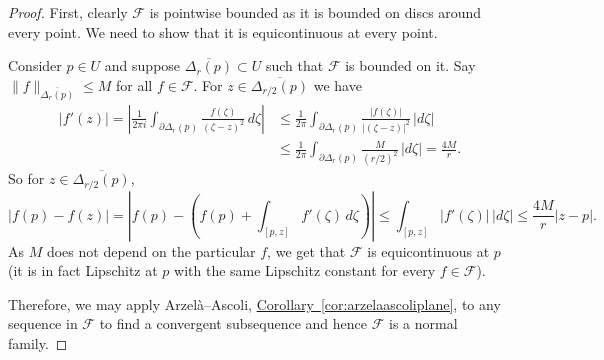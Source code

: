 \documentclass[12pt,openany]{book}
\newcommand{\sabs}[1]{\lvert {#1} \rvert}
\newcommand{\snorm}[1]{\lVert {#1} \rVert}
\newcommand{\abs}[1]{\left\lvert {#1} \right\rvert}
\newcommand{\sF}{{\mathscr{F}}}
\theoremstyle{plain}
\theoremstyle{remark}
\theoremstyle{definition}
\theoremstyle{exercise}
\theoremstyle{example}
\newcommand{\corref}[1]{\hyperref[#1]{Corollary~\ref*{#1}}}
\begin{document}
\begin{proof}
First, clearly $\sF$ is pointwise bounded as it is bounded on discs around
every point.
We need to show that it is equicontinuous at every point.

Consider $p \in U$ and suppose $\overline{\Delta_r(p)} \subset U$
such that $\sF$ is bounded on it.
Say $\snorm{f}_{\overline{\Delta_r(p)}} \leq M$ for all $f \in \sF$.
For $z \in \overline{\Delta_{r/2}(p)}$
we have
\begin{equation*}
\begin{split}
\abs{f'(z)}
=
\abs{
\frac{1}{2\pi i}
\int_{\partial \Delta_r(p)}
\frac{f(\zeta)}{{(\zeta-z)}^2} \, d\zeta
}
& \leq
\frac{1}{2\pi}
\int_{\partial \Delta_r(p)}
\frac{\sabs{f(\zeta)}}{\sabs{(\zeta-z)}^2} \, \sabs{d\zeta}
\\
& \leq
\frac{1}{2\pi}
\int_{\partial \Delta_r(p)}
\frac{M}{{(r/2)}^2} \, \sabs{d\zeta}
=
\frac{4 M}{r}.
\end{split}
\end{equation*}
So for $z \in \overline{\Delta_{r/2}(p)}$,
\begin{equation*}
\abs{f(p)-f(z)}
=
\abs{
f(p)
-
\left(
f(p) + \int_{[p,z]} f'(\zeta) \, d\zeta
\right)
}
\leq
\int_{[p,z]} \abs{f'(\zeta)} \, \sabs{d\zeta}
\leq
\frac{4 M}{r} \sabs{z-p} .
\end{equation*}
As $M$ does not depend on the particular $f$, we get that $\sF$ is
equicontinuous at $p$ (it is in fact Lipschitz at $p$ with the same
Lipschitz constant for every $f \in \sF$).

Therefore, we may apply Arzel\`a--Ascoli, 
\corref{cor:arzelaascoliplane}, to any sequence in $\sF$
to find a convergent subsequence and hence $\sF$ is a normal family.
\end{proof}
\end{document}
